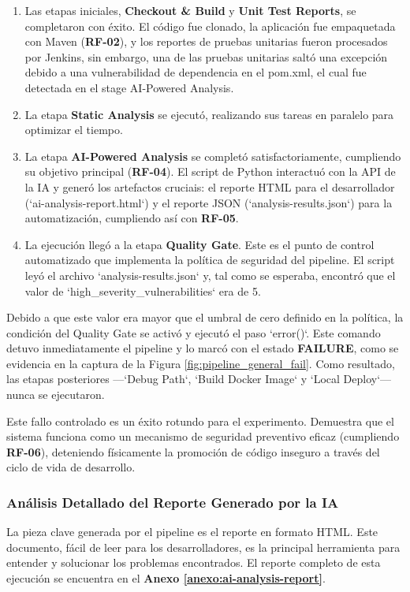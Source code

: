 \begin{enumerate}
    \item Las etapas iniciales, \textbf{Checkout \& Build} y \textbf{Unit Test Reports}, se completaron con éxito. El código fue clonado, la aplicación fue empaquetada con Maven (\textbf{RF-02}), y los reportes de pruebas unitarias fueron procesados por Jenkins, sin embargo, una de las pruebas unitarias saltó una excepción debido a una vulnerabilidad de dependencia en el pom.xml, el cual fue detectada en el stage AI-Powered Analysis.
    \item La etapa \textbf{Static Analysis} se ejecutó, realizando sus tareas en paralelo para optimizar el tiempo.
    \item La etapa \textbf{AI-Powered Analysis} se completó satisfactoriamente, cumpliendo su objetivo principal (\textbf{RF-04}). El script de Python interactuó con la API de la IA y generó los artefactos cruciais: el reporte HTML para el desarrollador (`ai-analysis-report.html`) y el reporte JSON (`analysis-results.json`) para la automatización, cumpliendo así con \textbf{RF-05}.
    \item La ejecución llegó a la etapa \textbf{Quality Gate}. Este es el punto de control automatizado que implementa la política de seguridad del pipeline. El script leyó el archivo `analysis-results.json` y, tal como se esperaba, encontró que el valor de `high_severity_vulnerabilities` era de 5. 
\end{enumerate}

Debido a que este valor era mayor que el umbral de cero definido en la política, la condición del Quality Gate se activó y ejecutó el paso `error()`. Este comando detuvo inmediatamente el pipeline y lo marcó con el estado \textbf{FAILURE}, como se evidencia en la captura de la Figura \ref{fig:pipeline_general_fail}. Como resultado, las etapas posteriores —`Debug Path`, `Build Docker Image` y `Local Deploy`— nunca se ejecutaron.

Este fallo controlado es un éxito rotundo para el experimento. Demuestra que el sistema funciona como un mecanismo de seguridad preventivo eficaz (cumpliendo \textbf{RF-06}), deteniendo físicamente la promoción de código inseguro a través del ciclo de vida de desarrollo.

\subsubsection{Análisis Detallado del Reporte Generado por la IA}
La pieza clave generada por el pipeline es el reporte en formato HTML. Este documento, fácil de leer para los desarrolladores, es la principal herramienta para entender y solucionar los problemas encontrados. El reporte completo de esta ejecución se encuentra en el \textbf{Anexo \ref{anexo:ai-analysis-report}}.

